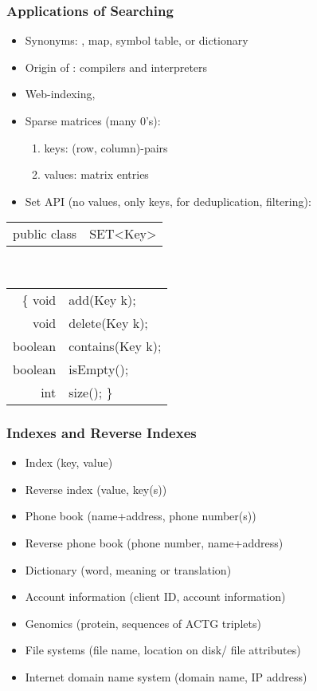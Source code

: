 \documentclass[handout]{beamer}
\begin{document}
\begin{frame}[fragile]
    \frametitle{Applications of Searching}

\begin{itemize}[<+->]
\item Synonyms: 
\href{https://en.wikipedia.org/wiki/Associative_array}{\color{red}{associative array}}, 
map, symbol table, or dictionary
\item Origin of
\href{https://en.wikipedia.org/wiki/Symbol_table}{\color{red}{symbol table}}: 
compilers and interpreters
\item Web-indexing, \href{https://en.wikipedia.org/wiki/Search_engine_indexing#Inverted_indices}{\color{red}{search engines}}
\item Sparse matrices (many 0's): \href{https://en.wikipedia.org/wiki/Sparse_matrix#Dictionary_of_keys_.28DOK.29}%
{\color{red}{dictionary}} 
  \begin{enumerate}[<+->]
  \item keys: (row, column)-pairs
  \item values: matrix entries
  \end{enumerate}
\item Set API (no values, only keys, for deduplication, filtering):
\end{itemize}
{\tt\begin{tabular}{ll}
public class &SET<Key> \\
 \end{tabular}\\
\begin{tabular}{rl}
\{  void       & add(Key k); \\
   void       & delete(Key k); \\
   boolean    & contains(Key k); \\
   boolean    & isEmpty();\\
   int        & size();              \}
\end{tabular}
}
\end{frame}

\begin{frame}[fragile]
    \frametitle{Indexes and Reverse Indexes}

\begin{itemize}[<+->]
\item Index (key, value)
\item Reverse index (value, key(s))
\item Phone book (name+address, phone number(s))
\item Reverse phone book (phone number, name+address)
\item Dictionary (word, meaning or translation)
\item Account information (client ID, account information)
\item Genomics (protein, sequences of ACTG triplets)
\item File systems (file name, location on disk/ file attributes)
\item Internet domain name system (domain name, IP address)
\end{itemize}
\end{frame}
\end{document}

